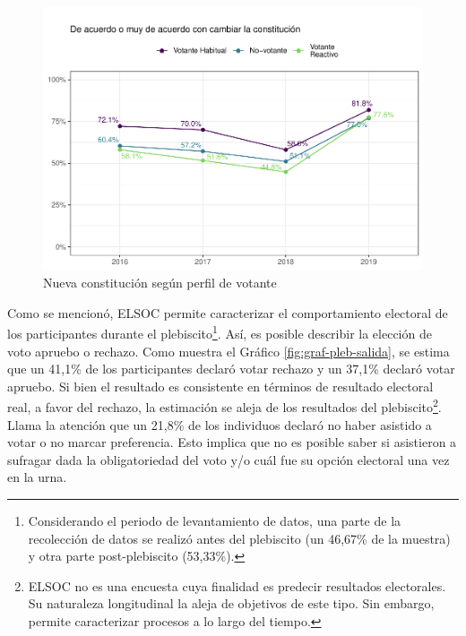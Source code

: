 \documentclass[
  12pt,
]{book}
\begin{document}
\begin{figure}

{\centering \includegraphics{reporte-elsoc_files/figure-latex/graf-consti-2-1} 

}

\caption{Nueva constitución según perfil de votante}\label{fig:graf-consti-2}
\end{figure}

Como se mencionó, ELSOC permite caracterizar el comportamiento electoral de los participantes durante el plebiscito\footnote{Considerando el periodo de levantamiento de datos, una parte de la recolección de datos se realizó antes del plebiscito (un 46,67\% de la muestra) y otra parte post-plebiscito (53,33\%).}. Así, es posible describir la elección de voto apruebo o rechazo. Como muestra el Gráfico \ref{fig:graf-pleb-salida}, se estima que un 41,1\% de los participantes declaró votar rechazo y un 37,1\% declaró votar apruebo. Si bien el resultado es consistente en términos de resultado electoral real, a favor del rechazo, la estimación se aleja de los resultados del plebiscito\footnote{ELSOC no es una encuesta cuya finalidad es predecir resultados electorales. Su naturaleza longitudinal la aleja de objetivos de este tipo. Sin embargo, permite caracterizar procesos a lo largo del tiempo.}. Llama la atención que un 21,8\% de los individuos declaró no haber asistido a votar o no marcar preferencia. Esto implica que no es posible saber si asistieron a sufragar dada la obligatoriedad del voto y/o cuál fue su opción electoral una vez en la urna.
\end{document}
